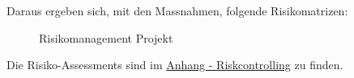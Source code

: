 \clearpage
{}
\recalctypearea
\begin{flushleft}
    Daraus ergeben sich, mit den Massnahmen, folgende Risikomatrizen:
    \begin{figure}[H]
        \centering
        \qquad
        \caption{Risikomanagement Projekt}
        \label{fig:riskmanagement_projekct}
    \end{figure}
    Die Risiko-Assessments sind im \hyperref[sec:riskcrontolling]{Anhang - Riskcontrolling} zu finden.
\end{flushleft}
